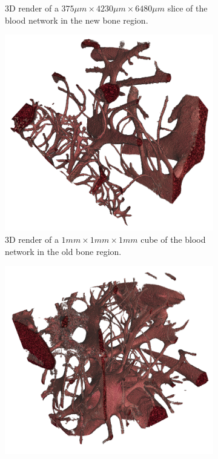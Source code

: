 \begin{figure}
\begin{subfigure}[b]{\linewidth}
        \caption{3D render of a $375\mu m \times 4230\mu m \times 6480\mu m$ slice of the blood network in the new bone region.}
        \label{fig:blood-new-slice}
    \end{subfigure}
    \begin{subfigure}[b]{.45\linewidth}
        \includegraphics[width=\linewidth,height=\linewidth]{figures/blood_old_cube.png}
        \caption{3D render of a $1mm \times 1 mm \times 1 mm$ cube of the blood network in the old bone region.}
        \label{fig:blood-old-cube}
    \end{subfigure}
    \hfill
    \begin{subfigure}[b]{.45\linewidth}
        \includegraphics[width=\linewidth,height=\linewidth]{figures/blood_new_cube.png}

\end{subfigure}
\end{figure}
